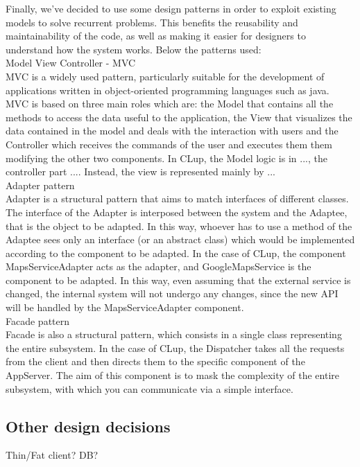 Finally, we've decided to use some design patterns in order to exploit existing models to solve recurrent problems. This benefits the reusability and maintainability of the code, as well as making it easier for designers to understand how the system works. Below the patterns used: \\
Model View Controller - MVC\\
MVC is a widely used pattern, particularly suitable for the development of applications written in object-oriented programming languages such as java. MVC is based on three main roles which are: the Model that contains all the methods to access the data useful to the application, the View that visualizes the data contained in the model and deals with the interaction with users and the Controller which receives the commands of the user and executes them them modifying the other two components. In CLup, the Model logic is in ..., the controller part .... Instead, the view is represented mainly by ...
\\
Adapter pattern\\
Adapter is a structural pattern that aims to match interfaces of different classes. The interface of the Adapter is interposed between the system and the Adaptee, that is the object to be adapted. In this way, whoever has to use a method of the Adaptee sees only an interface (or an abstract class) which would be implemented according to the component to be adapted. In the case of CLup, the component MapsServiceAdapter acts as the adapter, and GoogleMapsService is the component to be adapted. In this way, even assuming that the external service is changed, the internal system will not undergo any changes, since the new API will be handled by the MapsServiceAdapter component.\\
Facade pattern\\
Facade is also a structural pattern, which consists in a single class representing the entire subsystem. In the case of CLup, the Dispatcher takes all the requests from the client and then directs them to the specific component of the AppServer. The aim of this component is to mask the complexity of the entire subsystem, with which you can communicate via a simple interface.


\subsection {Other design decisions}
Thin/Fat client? DB?
